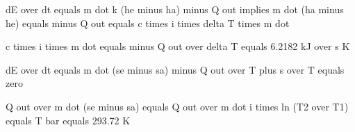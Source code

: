 dE over dt equals m dot k (he minus ha) minus Q out implies m dot (ha minus he) equals minus Q out equals c times i times delta T times m dot

c times i times m dot equals minus Q out over delta T equals 6.2182 kJ over s K

dE over dt equals m dot (se minus sa) minus Q out over T plus s over T equals zero

Q out over m dot (se minus sa) equals Q out over m dot i times ln (T2 over T1) equals T bar equals 293.72 K